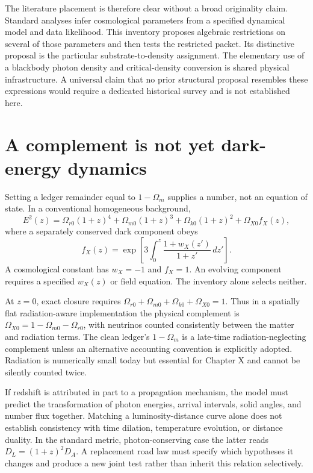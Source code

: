 The literature placement is therefore clear without a broad originality claim. Standard analyses infer cosmological parameters from a specified dynamical model and data likelihood. This inventory proposes algebraic restrictions on several of those parameters and then tests the restricted packet. Its distinctive proposal is the particular substrate-to-density assignment. The elementary use of a blackbody photon density and critical-density conversion is shared physical infrastructure. A universal claim that no prior structural proposal resembles these expressions would require a dedicated historical survey and is not established here.

\section{A complement is not yet dark-energy dynamics}
Setting a ledger remainder equal to $1-\Omega_m$ supplies a number, not an equation of state. In a conventional homogeneous background,
\begin{equation}
 E^2(z)=\Omega_{r0}(1+z)^4+\Omega_{m0}(1+z)^3
 +\Omega_{k0}(1+z)^2+\Omega_{X0}f_X(z),
 \label{c8:background}
\end{equation}
where a separately conserved dark component obeys
\begin{equation}
 f_X(z)=\exp\left[3\int_0^z\frac{1+w_X(z')}{1+z'}\,dz'\right].
 \label{c8:darkevolution}
\end{equation}
A cosmological constant has $w_X=-1$ and $f_X=1$. An evolving component requires a specified $w_X(z)$ or field equation. The inventory alone selects neither.

At $z=0$, exact closure requires $\Omega_{r0}+\Omega_{m0}+\Omega_{k0}+\Omega_{X0}=1$. Thus in a spatially flat radiation-aware implementation the physical complement is $\Omega_{X0}=1-\Omega_{m0}-\Omega_{r0}$, with neutrinos counted consistently between the matter and radiation terms. The clean ledger's $1-\Omega_m$ is a late-time radiation-neglecting complement unless an alternative accounting convention is explicitly adopted. Radiation is numerically small today but essential for Chapter X and cannot be silently counted twice.

If redshift is attributed in part to a propagation mechanism, the model must predict the transformation of photon energies, arrival intervals, solid angles, and number flux together. Matching a luminosity-distance curve alone does not establish consistency with time dilation, temperature evolution, or distance duality. In the standard metric, photon-conserving case the latter reads $D_L=(1+z)^2D_A$. A replacement road law must specify which hypotheses it changes and produce a new joint test rather than inherit this relation selectively.


